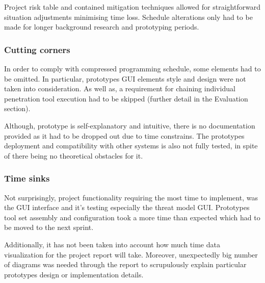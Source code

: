 		Project risk table and contained mitigation techniques allowed for straightforward situation adjustments minimising time loss. Schedule alterations only had to be made for longer background research and prototyping periods.
		
		\subsubsection{Cutting corners}\label{sec:cut-corners}
		In order to comply with compressed programming schedule, some elements had to be omitted. In particular, prototypes GUI elements style and design were not taken into consideration. As well as, a requirement for chaining individual penetration tool execution had to be skipped (further detail in the Evaluation section). 
		
		Although, prototype is self-explanatory and intuitive, there is no documentation provided as it had to be dropped out due to time constrains. The prototypes deployment and compatibility with other systems is also not fully tested, in spite of there being no theoretical obstacles for it. 
		
		\subsubsection{Time sinks}
		Not surprisingly, project functionality requiring the most time to implement, was the GUI interface and it's testing especially the threat model GUI. Prototypes tool set assembly and configuration took a more time than expected which had to be moved to the next sprint. 
		
		Additionally, it has not been taken into account how much time data visualization for the project report will take. Moreover, unexpectedly big number of diagrams was needed through the report to scrupulously explain particular prototypes design or implementation details. 
